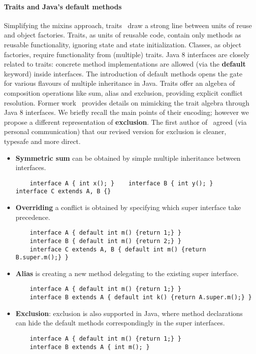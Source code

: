 \paragraph{Traits and Java's default methods}
Simplifying the mixins approach, traits~\cite{scharli03traits} draw a strong
line between units of reuse and object factories. Traits, as units of reusable
code, contain only methods as reusable functionality, ignoring state and state
initialization. Classes, as object factories, require functionality from
(multiple) traits. Java 8 interfaces are closely related to
traits: concrete method implementations are allowed (via the \textbf{default}
keyword) inside interfaces. The introduction of default methods opens the gate
for various flavours of multiple inheritance in Java. Traits offer an algebra
of composition operations like sum, alias and exclusion, providing explicit conflict
resolution. Former work~\cite{bono14} provides details on mimicking the trait
algebra through Java 8 interfaces.  We briefly recall the main points of their
encoding; however we propose a different representation of \textbf{exclusion}.
The first author of~\cite{bono14} agreed (via personal communication) that
our revised version for exclusion is cleaner, typesafe and more direct.

\newcommand\shortItem{\vspace{-1ex}}
\begin{itemize}
\item \textbf{Symmetric sum} can be obtained by simple multiple inheritance between interfaces.
    \begin{lstlisting}
    interface A { int x(); }    interface B { int y(); }    interface C extends A, B {}
    \end{lstlisting}
\shortItem
\item \textbf{Overriding} a conflict is obtained by specifying which super interface take precedence.
    \begin{lstlisting}
    interface A { default int m() {return 1;} }
    interface B { default int m() {return 2;} }
    interface C extends A, B { default int m() {return B.super.m();} }
    \end{lstlisting}
\shortItem
\item \textbf{Alias} is creating  a new method delegating to the existing super interface.
    \begin{lstlisting}
    interface A { default int m() {return 1;} }
    interface B extends A { default int k() {return A.super.m();} }
    \end{lstlisting}
\shortItem

\item \textbf{Exclusion}: exclusion is also supported in Java, where method declarations can hide the default methods correspondingly in the super interfaces.
    \begin{lstlisting}
    interface A { default int m() {return 1;} }
    interface B extends A { int m(); }
    \end{lstlisting}
\shortItem
\end{itemize}


